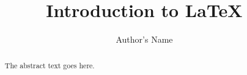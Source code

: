 \documentclass{article}
\begin{document}
\title{Introduction to \LaTeX{}}
\author{Author's Name}
\maketitle
\begin{abstract}
The abstract text goes here.
\end{abstract}
\end{document}
